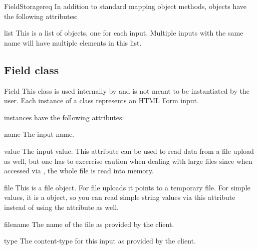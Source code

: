 \begin{classdesc}{FieldStorage}{req}
  In addition to standard mapping object methods,  objects
  have the following attributes:

  \begin{memberdesc}{list}
    This is a list of  objects, one for each input. Multiple
    inputs with the same name will have multiple elements in this list.
  \end{memberdesc}

\end{classdesc}

\subsection{Field class\label{pyapi-util-fstor-fld}}

\begin{classdesc}{Field}{}
  This class is used internally by  and is not
  meant to be instantiated by the user. Each instance of a 
  class represents an HTML Form input.

   instances have the following attributes:

  \begin{memberdesc}{name}
    The input name.
  \end{memberdesc}

  \begin{memberdesc}{value}
    The input value. This attribute can be used to read data from a file
    upload as well, but one has to excercise caution when dealing with
    large files since when accessed via , the whole file is
    read into memory.
  \end{memberdesc}

  \begin{memberdesc}{file}
    This is a file object. For file uploads it points to a temporary file.
    For simple values, it is a  object, so you can read
    simple string values via this attribute instead of using the 
    attribute as well.
  \end{memberdesc}

  \begin{memberdesc}{filename}
    The name of the file as provided by the client.
  \end{memberdesc}

  \begin{memberdesc}{type}
    The content-type for this input as provided by the client.
  \end{memberdesc}


\end{classdesc}

